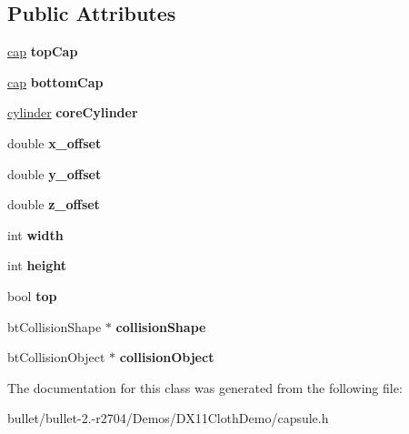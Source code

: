 \subsection*{Public Attributes}
\begin{DoxyCompactItemize}
\item 
\hypertarget{classcapsule_aff8ad13202928558009ea8740a751671}{\hyperlink{classcap}{cap} {\bfseries top\+Cap}}\label{classcapsule_aff8ad13202928558009ea8740a751671}

\item 
\hypertarget{classcapsule_add457edaff9ef2583fe79af8d78f1475}{\hyperlink{classcap}{cap} {\bfseries bottom\+Cap}}\label{classcapsule_add457edaff9ef2583fe79af8d78f1475}

\item 
\hypertarget{classcapsule_ae47e157b6e4b9dbd1f26ac7453fdd79b}{\hyperlink{classcylinder}{cylinder} {\bfseries core\+Cylinder}}\label{classcapsule_ae47e157b6e4b9dbd1f26ac7453fdd79b}

\item 
\hypertarget{classcapsule_ad40e23f14a081759b9ee36adfd6846e3}{double {\bfseries x\+\_\+offset}}\label{classcapsule_ad40e23f14a081759b9ee36adfd6846e3}

\item 
\hypertarget{classcapsule_aed382ce8116ecf6a8bf07badb49f2a93}{double {\bfseries y\+\_\+offset}}\label{classcapsule_aed382ce8116ecf6a8bf07badb49f2a93}

\item 
\hypertarget{classcapsule_abee24348858752a3aabfc1709f36108f}{double {\bfseries z\+\_\+offset}}\label{classcapsule_abee24348858752a3aabfc1709f36108f}

\item 
\hypertarget{classcapsule_a0eae94c2e32ddaa9fe28c38e462e10b2}{int {\bfseries width}}\label{classcapsule_a0eae94c2e32ddaa9fe28c38e462e10b2}

\item 
\hypertarget{classcapsule_ad1cfb7e0ef8d548f32089f15d5b50a4a}{int {\bfseries height}}\label{classcapsule_ad1cfb7e0ef8d548f32089f15d5b50a4a}

\item 
\hypertarget{classcapsule_a5293d6bcbd29bb1b63817e70631269d3}{bool {\bfseries top}}\label{classcapsule_a5293d6bcbd29bb1b63817e70631269d3}

\item 
\hypertarget{classcapsule_aae02d85c910098d865fb1d4666cff1a6}{bt\+Collision\+Shape $\ast$ {\bfseries collision\+Shape}}\label{classcapsule_aae02d85c910098d865fb1d4666cff1a6}

\item 
\hypertarget{classcapsule_a3f3ec8a9615f366fd4df8418435f93c4}{bt\+Collision\+Object $\ast$ {\bfseries collision\+Object}}\label{classcapsule_a3f3ec8a9615f366fd4df8418435f93c4}

\end{DoxyCompactItemize}


The documentation for this class was generated from the following file\+:\begin{DoxyCompactItemize}
\item 
bullet/bullet-\/2.-\/r2704/\+Demos/\+D\+X11\+Cloth\+Demo/capsule.\+h\end{DoxyCompactItemize}
